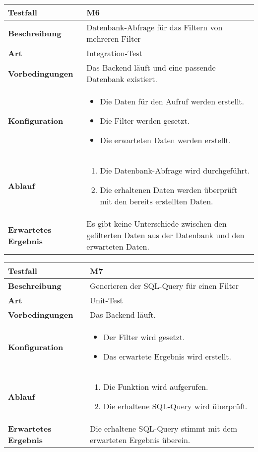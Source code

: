 \begin{longtable}{p{}|p{}}
	\hline
	\textbf{Testfall}               & \textbf{M6} \\
	\hline
	\textbf{Beschreibung}   		& Datenbank-Abfrage für das Filtern von mehreren Filter \\
	\hline
	\textbf{Art}    				& Integration-Test \\
	\hline
	\textbf{Vorbedingungen}    		& Das Backend läuft und eine passende Datenbank existiert. \\
	\hline
	\textbf{Konfiguration}   	 	& 
	\begin{itemize}
		\item Die Daten für den Aufruf werden erstellt.
		\item Die Filter werden gesetzt.
		\item Die erwarteten Daten werden erstellt.
	\end{itemize} \\
	\hline
	\textbf{Ablauf}    				& 
	\begin{enumerate}
		\item Die Datenbank-Abfrage wird durchgeführt.
		\item Die erhaltenen Daten werden überprüft mit den bereits erstellten Daten.
	\end{enumerate} \\
	\hline
	\textbf{Erwartetes Ergebnis}    & Es gibt keine Unterschiede zwischen den gefilterten Daten aus der Datenbank und den erwarteten Daten. \\
	\hline
\end{longtable}\label{tab:testfall-M6}

\begin{longtable}{p{}|p{}}
	\hline
	\textbf{Testfall}               & \textbf{M7} \\
	\hline
	\textbf{Beschreibung}   		& Generieren der SQL-Query für einen Filter \\
	\hline
	\textbf{Art}    				& Unit-Test \\
	\hline
	\textbf{Vorbedingungen}    		& Das Backend läuft. \\
	\hline
	\textbf{Konfiguration}   	 	& 
	\begin{itemize}
		\item Der Filter wird gesetzt.
		\item Das erwartete Ergebnis wird erstellt.
	\end{itemize} \\
	\hline
	\textbf{Ablauf}    				& 
	\begin{enumerate}
		\item Die Funktion wird aufgerufen.
		\item Die erhaltene SQL-Query wird überprüft.
	\end{enumerate} \\
	\hline
	\textbf{Erwartetes Ergebnis}    & Die erhaltene SQL-Query stimmt mit dem erwarteten Ergebnis überein. \\
	\hline
\end{longtable}\label{tab:testfall-M7}

